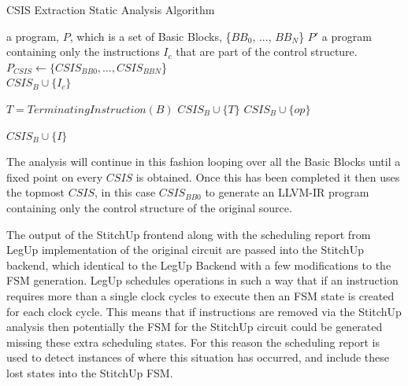 \begin{algorithm}[t]
\caption{CSIS Extraction Static Analysis Algorithm
\label{alg:CSIS-extraction}}
    \begin{algorithmic}
        \INPUT a program, $P$, which is a set of Basic Blocks, \{$BB_0$, ..., $BB_N$\}
        \OUTPUT $P'$ a program containing only the instructions $I_c$ that are part of the control structure.
        \Statex
            \State $P_{CSIS} \gets \{CSIS_{BB0}, \dots,  CSIS_{BBN}$\}
                \\\hrulefill
                        \State $CSIS_B \cup \{I_{c}\}$
                    \EndFor
                \EndFor
                \\\hrulefill

                \State $T = TerminatingInstruction(B)$
                \State $CSIS_{B} \cup \{T\}$
                    \State $CSIS_{B} \cup \{op\}$
                \EndFor
                \\\hrulefill

                                \State $CSIS_{B} \cup \{I\}$
                            \EndIf
                        \EndFor
                    \EndFor
                \EndFor
            \EndFor
        \EndWhile
    \end{algorithmic}
\end{algorithm}

The analysis will continue in this fashion looping over all the Basic Blocks until a fixed
point on every $CSIS$ is obtained.
Once this has been completed it then uses the topmost $CSIS$, in this case $CSIS_{BB0}$ to
generate an LLVM-IR program containing only the control structure of the original
source.

The output of the StitchUp frontend along with the scheduling report from LegUp
implementation of the original circuit are passed into the StitchUp backend, which identical
to the LegUp Backend with a few modifications to the FSM generation.
LegUp schedules operations in such a way that if an instruction requires more than a single
clock cycles to execute then an FSM state is created for each clock cycle.
This means that if instructions are removed via the StitchUp analysis then potentially
the FSM for the StitchUp circuit could be generated missing these extra scheduling states.
For this reason the scheduling report is used to detect instances of where this situation has occurred,
and include these lost states into the StitchUp FSM.



